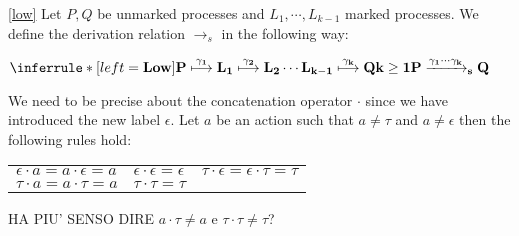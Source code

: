   
\begin{definition}\ref{low}
  Let $P, Q$ be unmarked processes and $L_{1}, \cdots, L_{k-1}$ marked processes. We define the derivation relation $\rightarrow_{s}$ in the following way:
  \begin{center}
    $\inferrule* [left=\bf{Low}]{
	P \stackrel{\gamma_{1}}{\longmapsto} L_{1} \stackrel{\gamma_{2}}{\longmapsto} L_{2} \cdots L_{k-1} \stackrel{\gamma_{k}}{\longmapsto} Q
      \\
	k\geq 1
    }{
      P \xrightarrow{\gamma_{1} \cdots \gamma_{k}}_{s}  Q
    }$
  \end{center}
  We need to be precise about the concatenation operator $\cdot$ since we have introduced the new label $\epsilon$. Let $a$ be an action such that $a\neq \tau$ and $a\neq \epsilon$ then the following rules hold:
  \begin{center}
      \begin{tabular}{lll}
	  $\epsilon \cdot a = a \cdot \epsilon = a$
	&
	  $\epsilon \cdot \epsilon = \epsilon$
	&
	  $\tau \cdot \epsilon = \epsilon \cdot \tau = \tau$
	\\
	  $\tau \cdot a = a \cdot \tau = a$
	&
	  $\tau \cdot \tau = \tau$
	&
      \end{tabular}
  \end{center}

  HA PIU' SENSO DIRE $a \cdot \tau \neq a$ e $\tau \cdot \tau \neq \tau$?

\end{definition}

